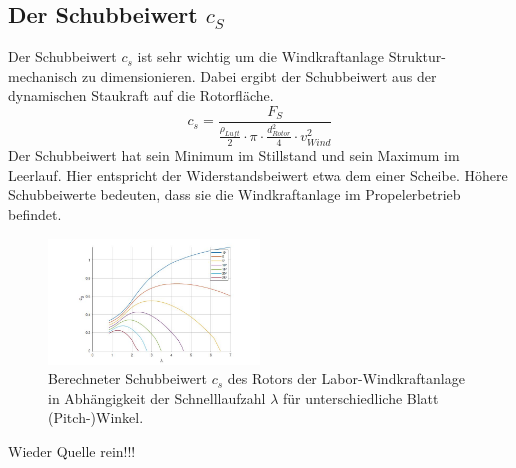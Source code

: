 \subsection{Der Schubbeiwert \texorpdfstring{$c_S$}{}}
Der Schubbeiwert $c_{s}$ ist sehr wichtig um die Windkraftanlage Struktur-mechanisch zu dimensionieren.  Dabei ergibt der Schubbeiwert aus der dynamischen Staukraft auf die Rotorfläche.
\begin{equation}
  c_{s}= \frac{F_{S}}{\frac{\rho_{Luft}}{2}\cdot \pi \cdot \frac{d^2_{Rotor}}{4} \cdot v^2_{Wind}}
    \label{eq:Schubbeiwert_cs}
\end{equation}
Der Schubbeiwert hat sein Minimum im Stillstand und sein Maximum im Leerlauf. Hier entspricht der Widerstandsbeiwert etwa dem einer Scheibe. Höhere Schubbeiwerte bedeuten, dass sie die Windkraftanlage im Propelerbetrieb befindet.
\begin{figure}[!ht]
    \centering
    \includegraphics[width=0.5\textwidth]{Abbildungen/cszulambda.jpg}
    \caption{Berechneter Schubbeiwert $c_{s}$ des Rotors der Labor-Windkraftanlage in Abhängigkeit der Schnelllaufzahl $\lambda$ für unterschiedliche Blatt (Pitch-)Winkel.\cite{Anleitung}}
    \label{fig:cszulambda}
\end{figure}
Wieder Quelle rein!!!
